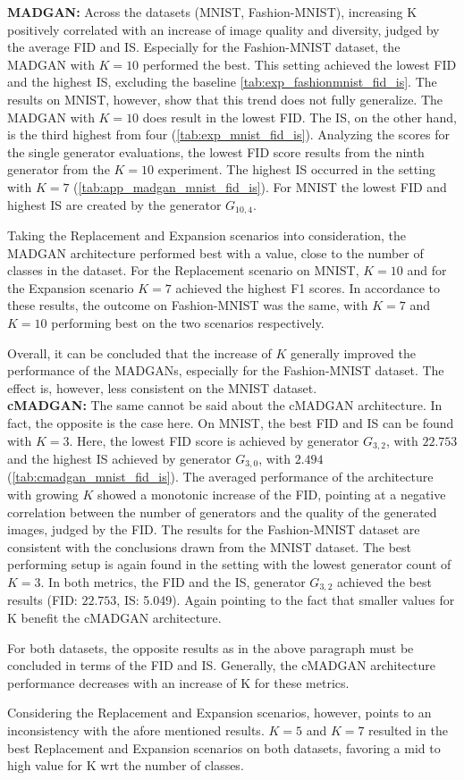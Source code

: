 \noindent\textbf{MADGAN:}
Across the datasets (MNIST, Fashion-MNIST), increasing K positively correlated with an increase of image quality and diversity, judged by the average FID and IS. Especially for the Fashion-MNIST dataset, the MADGAN with $K=10$ performed the best. This setting achieved the lowest FID and the highest IS, excluding the baseline \ref{tab:exp_fashionmnist_fid_is}. The results on MNIST, however, show that this trend does not fully generalize. The MADGAN with $K=10$ does result in the lowest FID. The IS, on the other hand, is the third highest from four (\ref{tab:exp_mnist_fid_is}). Analyzing the scores for the single generator evaluations, the lowest FID score results from the ninth generator from the $K=10$ experiment. The highest IS occurred in the setting with $K=7$ (\ref{tab:app_madgan_mnist_fid_is}). For MNIST the lowest FID and highest IS are created by the generator \(G_{10,4}\).

Taking the Replacement and Expansion scenarios into consideration, the MADGAN architecture performed best with a value, close to the number of classes in the dataset. For the Replacement scenario on MNIST, $K=10$ and for the Expansion scenario $K=7$ achieved the highest F1 scores. In accordance to these results, the outcome on Fashion-MNIST was the same, with $K=7$ and $K=10$ performing best on the two scenarios respectively.

Overall, it can be concluded that the increase of $K$ generally improved the performance of the MADGANs, especially for the Fashion-MNIST dataset. The effect is, however, less consistent on the MNIST dataset. \\

\noindent\textbf{cMADGAN:}
The same cannot be said about the cMADGAN architecture. In fact, the opposite is the case here. On MNIST, the best FID and IS can be found with $K=3$. Here, the lowest FID score is achieved by generator \(G_{3,2}\), with $22.753$ and the highest IS achieved by generator \(G_{3,0}\), with $2.494$ (\ref{tab:cmadgan_mnist_fid_is}). The averaged performance of the architecture with growing $K$ showed a monotonic increase of the FID, pointing at a negative correlation between the number of generators and the quality of the generated images, judged by the FID.
The results for the Fashion-MNIST dataset are consistent with the conclusions drawn from the MNIST dataset. The best performing setup is again found in the setting with the lowest generator count of $K=3$. In both metrics, the FID and the IS, generator \(G_{3,2}\) achieved the best results (FID: $22.753$, IS: 5.049). Again pointing to the fact that smaller values for K benefit the cMADGAN architecture.

For both datasets, the opposite results as in the above paragraph must be concluded in terms of the FID and IS. Generally, the cMADGAN architecture performance decreases with an increase of K for these metrics.

Considering the Replacement and Expansion scenarios, however, points to an inconsistency with the afore mentioned results. $K=5$ and $K=7$ resulted in the best Replacement and Expansion scenarios on both datasets, favoring a mid to high value for K wrt the number of classes.


\newpage
